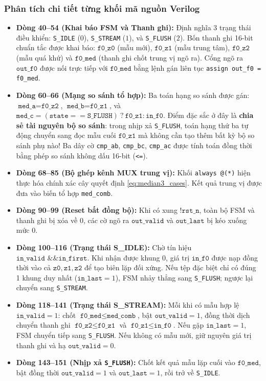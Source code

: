 \subsubsection*{Phân tích chi tiết từng khối mã nguồn Verilog}
\begin{itemize}
    \item \textbf{Dòng 40--54 (Khai báo FSM và Thanh ghi):} Định nghĩa 3 trạng thái điều khiển: \texttt{S\_IDLE} ($0$), \texttt{S\_STREAM} ($1$), và \texttt{S\_FLUSH} ($2$). Bốn thanh ghi 16-bit chuẩn tắc được khai báo: $\texttt{f0\_z0}$ (mẫu mới), $\texttt{f0\_z1}$ (mẫu trung tâm), $\texttt{f0\_z2}$ (mẫu quá khứ) và $\texttt{f0\_med}$ (thanh ghi chốt trung vị ngõ ra). Cổng ngõ ra $\texttt{out\_f0}$ được nối trực tiếp với $\texttt{f0\_med}$ bằng lệnh gán liên tục \texttt{assign out\_f0 = f0\_med}.
    \item \textbf{Dòng 60--66 (Mạng so sánh tổ hợp):} Ba toán hạng so sánh được gán: $\texttt{med\_a} = \texttt{f0\_z2}$, $\texttt{med\_b} = \texttt{f0\_z1}$, và $\texttt{med\_c} = (\texttt{state} == \texttt{S\_FLUSH})\ ?\ \texttt{f0\_z1} : \texttt{in\_f0}$. Điểm đặc sắc ở đây là \textbf{chia sẻ tài nguyên bộ so sánh}: trong nhịp xả \texttt{S\_FLUSH}, toán hạng thứ ba tự động chuyển sang đọc mẫu cuối $\texttt{f0\_z1}$ mà không cần tạo thêm bất kỳ bộ so sánh phụ nào! Ba dây cờ \texttt{cmp\_ab}, \texttt{cmp\_bc}, \texttt{cmp\_ac} được tính toán đồng thời bằng phép so sánh không dấu 16-bit (\texttt{<=}).
    \item \textbf{Dòng 68--85 (Bộ ghép kênh MUX trung vị):} Khối \texttt{always @(*)} hiện thực hóa chính xác cây quyết định \eqref{eq:median3_cases}. Kết quả trung vị được đưa vào biến tổ hợp \texttt{med\_comb}.
    \item \textbf{Dòng 90--99 (Reset bất đồng bộ):} Khi có xung $\texttt{!rst\_n}$, toàn bộ FSM và thanh ghi bị xóa về $0$, các cờ ngõ ra $\texttt{out\_valid}$ và $\texttt{out\_last}$ bị kéo xuống mức $0$.
    \item \textbf{Dòng 100--116 (Trạng thái S\_IDLE):} Chờ tín hiệu $\texttt{in\_valid \&\& in\_first}$. Khi nhận được khung 0, giá trị $\texttt{in\_f0}$ được nạp đồng thời vào cả $\texttt{z0}, \texttt{z1}, \texttt{z2}$ để tạo biên lặp đối xứng. Nếu tệp đặc biệt chỉ có đúng 1 khung duy nhất ($\texttt{in\_last} = 1$), FSM nhảy thẳng sang \texttt{S\_FLUSH}; ngược lại chuyển sang \texttt{S\_STREAM}.
    \item \textbf{Dòng 118--141 (Trạng thái S\_STREAM):} Mỗi khi có mẫu hợp lệ $\texttt{in\_valid} = 1$: chốt $\texttt{f0\_med} \le \texttt{med\_comb}$, bật $\texttt{out\_valid} = 1$, đồng thời dịch chuyển thanh ghi $\texttt{f0\_z2} \le \texttt{f0\_z1}$ và $\texttt{f0\_z1} \le \texttt{in\_f0}$. Nếu gặp $\texttt{in\_last} = 1$, FSM chuyển tiếp sang \texttt{S\_FLUSH}. Nếu không có mẫu mới, giữ nguyên giá trị thanh ghi và hạ $\texttt{out\_valid} = 0$.
    \item \textbf{Dòng 143--151 (Nhịp xả \texttt{S\_FLUSH}):} Chốt kết quả mẫu lặp cuối vào $\texttt{f0\_med}$, bật đồng thời $\texttt{out\_valid} = 1$ và $\texttt{out\_last} = 1$, rồi trở về \texttt{S\_IDLE}.
\end{itemize}


